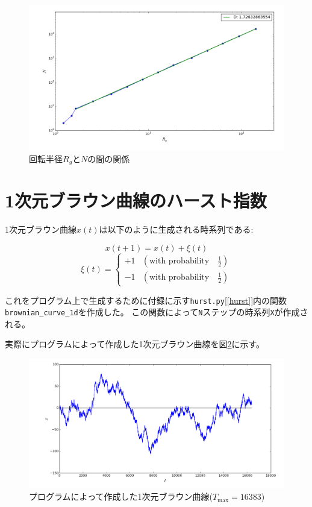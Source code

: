 \documentclass{jsarticle}
\theoremstyle{definition}
\begin{document}
\begin{figure}[H]
  \begin{center}
    \includegraphics[width=\textwidth]{../img/fractal_dimension.pdf}
    \caption{回転半径$R_{g}$と$N$の間の関係}
    \label{fig:f2}
  \end{center}
\end{figure}

\section{1次元ブラウン曲線のハースト指数}

1次元ブラウン曲線$x(t)$は以下のように生成される時系列である:

\[x(t + 1) = x(t) + \xi(t)\]
\[\xi(t) = \left\{ \begin{array}{ll} +1 & (\text{with probability}\quad \frac{1}{2})\\
-1 & (\text{with probability}\quad \frac{1}{2}) \end{array}\right.\]

これをプログラム上で生成するために付録に示す\texttt{hurst.py}[\ref{hurst}]内の関数\texttt{brownian\_curve\_1d}を作成した。
この関数によって\texttt{N}ステップの時系列\texttt{X}が作成される。

実際にプログラムによって作成した1次元ブラウン曲線を図\ref{fig:f3}に示す。

\begin{figure}[H]
  \begin{center}
    \includegraphics[width=\textwidth]{../img/brownian_motion.pdf}
    \caption{プログラムによって作成した1次元ブラウン曲線($T_{\text{max}} = 16383$)}
    \label{fig:f3}
  \end{center}
\end{figure}
\end{document}
